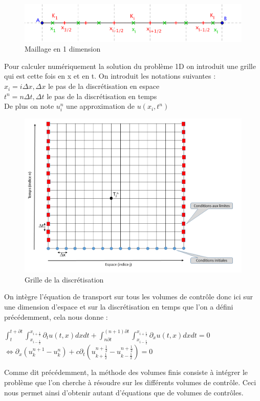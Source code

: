 \documentclass[12pt]{article}
\begin{document}
    \begin{figure}[H]
	\centering
	\includegraphics[scale=0.4]{VF2.png}
	\caption{Maillage en 1 dimension}
	\label{1D}
	\end{figure}
\newpage
\noindent Pour calculer numériquement la solution du problème 1D on introduit une grille qui est cette fois en x et en t.
\noindent On introduit les notations suivantes :
\\
 $x_i=i\Delta x, \Delta x$ le pas de la discrétisation en espace
\\
$ t^n=n\Delta t, \Delta t$ le pas de la discrétisation en temps
\\De plus on note $u_i^n$ une approximation de $u(x_i,t^n)$
 \begin{figure}[H]
	\centering
	\includegraphics[scale=0.3]{DFGrille.PNG}
	\caption{Grille de la discrétisation}
	\label{1D}
	\end{figure}
\noindent On intègre l’équation de transport sur tous les volumes de contrôle donc ici sur une dimension d'espace et sur la discrétisation en temps que l'on a défini précédemment, cela nous donne :

\begin{center}
      $ \displaystyle \int_{t}^{t+\partial t}\int_{x_{i-\frac{1}{2}}}^{x_{i+\frac{1}{2}}}\partial_tu(t,x) dxdt + \int_{n\partial t}^{(n+1)\partial t}\int_{x_{i-\frac{1}{2}}}^{x_{i+\frac{1}{2}}} \partial_xu(t,x) dxdt =0$
      \\$\Leftrightarrow \displaystyle \partial_x (u_k^{n+1} -u_k^n) + c\partial_t \left(u_{k+\frac{1}{2}}^{n+\frac{1}{2}}-u_{k-\frac{1}{2}}^{n+\frac{1}{2}}\right)=0$
\end{center}
\noindent Comme dit précédemment, la méthode des volumes finis consiste à intégrer le problème que l'on cherche à résoudre sur les différents volumes de contrôle. Ceci nous permet ainsi d'obtenir autant d'équations que de volumes de contrôles. 
\end{document}
